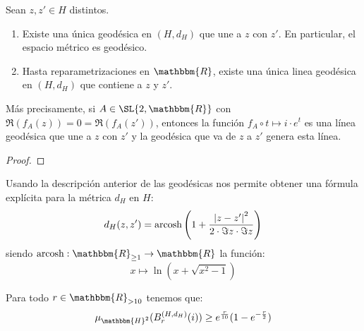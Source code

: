 \documentclass[12pt]{report}
\theoremstyle{largebreak}
\newcommand\abs[1]{\ensuremath{\left|#1\right|}}
\newcommand\cf[3]{\ensuremath{#1:#2\rightarrow#3}}
\newcommand{\bbm}[1]{\ensuremath{\mathbbm{#1}}}
\begin{document}
    \newcommand{\arcosh}[1]{\ensuremath{\textup{arcosh}\left(#1\right)}}

    \begin{theor}
        \label{caracterizacionGeodesicas}
        Sean $z,z'\in H$ distintos.
        \begin{enumerate}[label = \textit{(\arabic*)}]
            \item Existe una única geodésica en $(H,d_H)$ que une a $z$ con $z'$. En particular, el espacio métrico es geodésico.
            \item Hasta reparametrizaciones en $\bbm{R}$, existe una única linea geodésica en $(H,d_H)$ que contiene a $z$ y $z'$. 
        \end{enumerate}
        Más precisamente, si $A\in\SL{2,\bbm{R}}$ con $\Re(f_A(z))=0=\Re(f_A(z'))$, entonces la función $f_A\circ t\mapsto i\cdot e^{ t}$ es una línea geodésica que une a $z$ con $z'$ y la geodésica que va de $z$ a $z'$ genera esta línea.
    \end{theor}

    \begin{proof}
    \end{proof}

    \begin{obs}
        Usando la descripción anterior de las geodésicas nos permite obtener una fórmula explícita para la métrica $d_H$ en $H$:
        \begin{equation*}
            d_H(z,z')=\arcosh{1+\frac{\abs{z-z'}^2}{2\cdot\Im{z}\cdot\Im{z}}}
        \end{equation*}
        siendo $\cf{\textup{arcosh}}{\bbm{R}_{\geq1}}{\bbm{R}}$ la función:
        \begin{equation*}
            x\mapsto\ln\left(x+\sqrt{x^2-1} \right)
        \end{equation*}
    \end{obs}

    \begin{propo}
        Para todo $r\in\bbm{R}_{>10}$ tenemos que:
        \begin{equation*}
            \mu_{\bbm{H}^2}(B_r^{(H,d_H)}(i))\geq e^{\frac{r}{10}}(1-e^{-\frac{r}{2}})
        \end{equation*}
    \end{propo}
\end{document}
